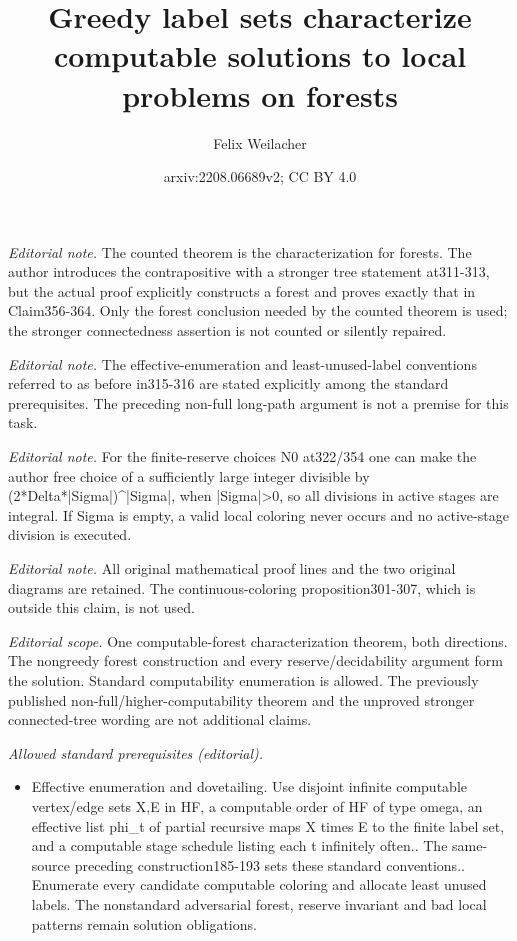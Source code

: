 \documentclass[10pt,a4paper]{amsart}
\title{Greedy label sets characterize computable solutions to local problems on forests}
\author{Felix Weilacher}
\date{arxiv:2208.06689v2; CC BY 4.0}
\theoremstyle{definition}
\begin{document}
\maketitle
\noindent\textit{Editorial note.} The counted theorem is the characterization for forests. The author introduces the contrapositive with a stronger tree statement at311-313, but the actual proof explicitly constructs a forest and proves exactly that in Claim356-364. Only the forest conclusion needed by the counted theorem is used; the stronger connectedness assertion is not counted or silently repaired.\par\medskip
\noindent\textit{Editorial note.} The effective-enumeration and least-unused-label conventions referred to as before in315-316 are stated explicitly among the standard prerequisites. The preceding non-full long-path argument is not a premise for this task.\par\medskip
\noindent\textit{Editorial note.} For the finite-reserve choices N0 at322/354 one can make the author free choice of a sufficiently large integer divisible by (2*Delta*|Sigma|)\textasciicircum{}|Sigma|, when |Sigma|>0, so all divisions in active stages are integral. If Sigma is empty, a valid local coloring never occurs and no active-stage division is executed.\par\medskip
\noindent\textit{Editorial note.} All original mathematical proof lines and the two original diagrams are retained. The continuous-coloring proposition301-307, which is outside this claim, is not used.\par\medskip
\noindent\textit{Editorial scope.} One computable-forest characterization theorem, both directions. The nongreedy forest construction and every reserve/decidability argument form the solution. Standard computability enumeration is allowed. The previously published non-full/higher-computability theorem and the unproved stronger connected-tree wording are not additional claims.\par\medskip
\noindent\textit{Allowed standard prerequisites (editorial).}\begin{itemize}
\item Effective enumeration and dovetailing. Use disjoint infinite computable vertex/edge sets X,E in HF, a computable order of HF of type omega, an effective list phi\_t of partial recursive maps X times E to the finite label set, and a computable stage schedule listing each t infinitely often.. The same-source preceding construction185-193 sets these standard conventions.. Enumerate every candidate computable coloring and allocate least unused labels. The nonstandard adversarial forest, reserve invariant and bad local patterns remain solution obligations.
\end{itemize}\medskip
\end{document}
